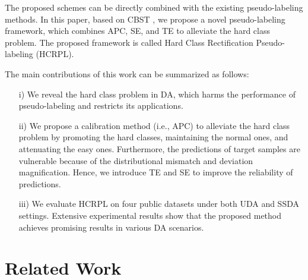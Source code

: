\documentclass[a4paper,fleqn]{cas-dc}
\begin{document}
	The proposed schemes can be directly combined with the existing pseudo-labeling methods. In this paper, based on CBST  \cite{zou2018domain}, we propose a novel pseudo-labeling framework, which combines APC, SE, and TE to alleviate the hard class problem. The proposed framework is called Hard Class Rectification Pseudo-labeling (HCRPL).
	

	
	The main contributions of this work can be summarized as follows:
	\begin{itemize}
		\item [i)]
		{We reveal the hard class problem in DA, which harms the performance of pseudo-labeling and restricts its applications. }
		\item [ii)]
		{We propose a calibration method (i.e., APC) to alleviate the hard class problem by promoting the hard classes, maintaining the normal ones, and attenuating the easy ones. Furthermore, the predictions of target samples are vulnerable because of the distributional mismatch and deviation magnification. Hence,  we introduce TE and SE to improve the reliability of predictions.} 
		\item [iii)]
		We evaluate HCRPL on four public datasets under both UDA and SSDA settings. Extensive experimental results show that the proposed method achieves promising results in various DA scenarios. 
	\end{itemize}
	
	\section{Related Work} \label{sec3}
\end{document}
